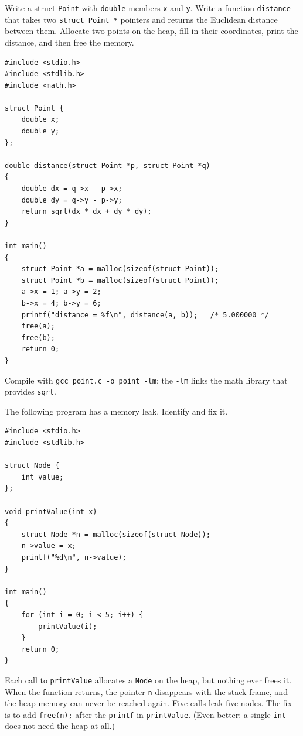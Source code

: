 \begin{Exercise}[title={Distance Between Points}, label=c_point]
Write a struct \texttt{Point} with \texttt{double} members \texttt{x} and
\texttt{y}. Write a function \texttt{distance} that takes two
\texttt{struct Point *} pointers and returns the Euclidean distance between
them. Allocate two points on the heap, fill in their coordinates, print the
distance, and then free the memory.
\end{Exercise}
\begin{Answer}[ref=c_point]
\begin{verbatim}
#include <stdio.h>
#include <stdlib.h>
#include <math.h>

struct Point {
    double x;
    double y;
};

double distance(struct Point *p, struct Point *q)
{
    double dx = q->x - p->x;
    double dy = q->y - p->y;
    return sqrt(dx * dx + dy * dy);
}

int main()
{
    struct Point *a = malloc(sizeof(struct Point));
    struct Point *b = malloc(sizeof(struct Point));
    a->x = 1; a->y = 2;
    b->x = 4; b->y = 6;
    printf("distance = %f\n", distance(a, b));   /* 5.000000 */
    free(a);
    free(b);
    return 0;
}
\end{verbatim}
Compile with \texttt{gcc point.c -o point -lm}; the \texttt{-lm} links the
math library that provides \texttt{sqrt}.
\end{Answer}

\begin{Exercise}[title={Memory Leak Hunt}, label=c_leak]
The following program has a memory leak. Identify and fix it.

\begin{verbatim}
#include <stdio.h>
#include <stdlib.h>

struct Node {
    int value;
};

void printValue(int x)
{
    struct Node *n = malloc(sizeof(struct Node));
    n->value = x;
    printf("%d\n", n->value);
}

int main()
{
    for (int i = 0; i < 5; i++) {
        printValue(i);
    }
    return 0;
}
\end{verbatim}
\end{Exercise}
\begin{Answer}[ref=c_leak]
Each call to \texttt{printValue} allocates a \texttt{Node} on the heap,
but nothing ever frees it. When the function returns, the pointer
\texttt{n} disappears with the stack frame, and the heap memory can never
be reached again. Five calls leak five nodes. The fix is to add
\texttt{free(n);} after the \texttt{printf} in \texttt{printValue}. (Even
better: a single \texttt{int} does not need the heap at all.)
\end{Answer}

